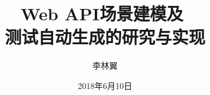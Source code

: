 \documentclass[a4paper]{ctexbook}
\begin{document}
\title{Web API场景建模及 \\测试自动生成的研究与实现}
\author{李林翼}
\date{2018年6月10日}
\maketitle

\tableofcontents









% 

\end{document}
